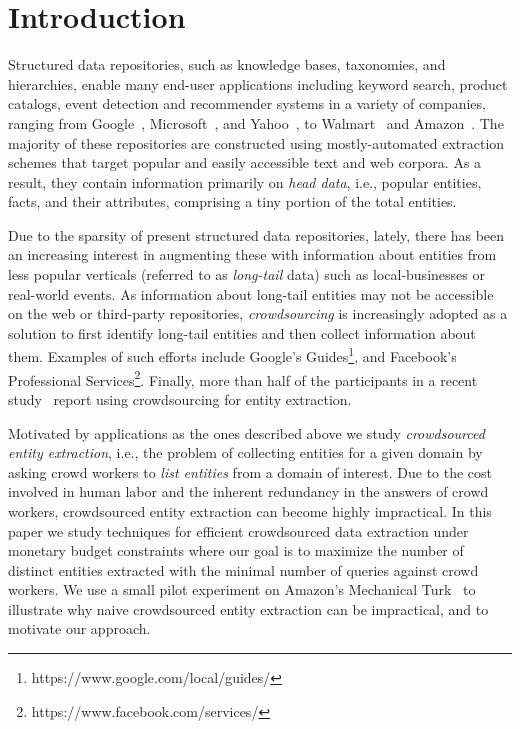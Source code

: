 
\section{Introduction}
\label{sec:intro}
Structured data repositories, such as knowledge bases, taxonomies, and hierarchies, enable many end-user applications including keyword search, product catalogs, event detection and recommender systems in a variety of companies, ranging from Google~\cite{singhal2012introducing}, Microsoft~\cite{cheng2010fuzzy}, and Yahoo~\cite{woo}, to 
Walmart~\cite{Deshpande:2013:BMU:2463676.2465297} and Amazon~\cite{amazon-product}. The majority of these repositories are constructed using mostly-automated extraction schemes that target popular and easily accessible text and web corpora. As a result, they contain information primarily on {\em head data}, i.e., popular entities, facts, and their attributes, comprising a tiny portion of the total entities.

Due to the sparsity of present structured data repositories, lately, there has been an increasing interest in augmenting these with information about entities from less popular verticals (referred to as {\em long-tail} data) such as local-businesses or real-world events. As information about long-tail entities may not be accessible on the web or third-party repositories, {\em crowdsourcing} is increasingly adopted as a solution to first identify long-tail entities and then collect information about them. Examples of such efforts include Google's Guides\footnote{https://www.google.com/local/guides/}, and Facebook's Professional Services\footnote{https://www.facebook.com/services/}. Finally, more than half of the participants in a recent study~\cite{DBS-044} report using crowdsourcing for entity extraction.

Motivated by applications as the ones described above we study {\em crowdsourced entity extraction}, i.e., the problem of collecting entities for a given domain by asking crowd workers to {\em list entities} from a domain of interest. Due to the cost involved in human labor and the inherent redundancy in the answers of crowd workers, crowdsourced entity extraction can become highly impractical. In this paper we study techniques for efficient crowdsourced data extraction under monetary budget constraints where our goal is to maximize the number of distinct entities extracted with the minimal number of queries against crowd workers. We use a small pilot experiment on Amazon's Mechanical Turk~\cite{mturk} to illustrate why naive crowdsourced entity extraction can be impractical, and to motivate our approach. 

